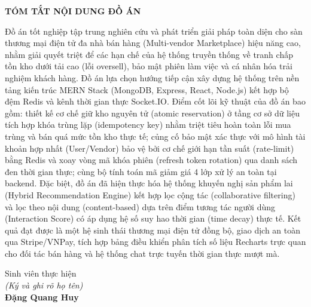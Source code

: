 \documentclass[../DoAn.tex]{subfiles}
\begin{document}
\begin{center}
    \Large{\textbf{TÓM TẮT NỘI DUNG ĐỒ ÁN}}\\
\end{center}
\vspace{1cm}

Đồ án tốt nghiệp tập trung nghiên cứu và phát triển giải pháp toàn diện cho sàn thương mại điện tử đa nhà bán hàng (Multi-vendor Marketplace) hiệu năng cao, nhằm giải quyết triệt để các hạn chế của hệ thống truyền thống về tranh chấp tồn kho dưới tải cao (lỗi oversell), bảo mật phiên làm việc và cá nhân hóa trải nghiệm khách hàng. Đồ án lựa chọn hướng tiếp cận xây dựng hệ thống trên nền tảng kiến trúc MERN Stack (MongoDB, Express, React, Node.js) kết hợp bộ đệm Redis và kênh thời gian thực Socket.IO. Điểm cốt lõi kỹ thuật của đồ án bao gồm: thiết kế cơ chế giữ kho nguyên tử (atomic reservation) ở tầng cơ sở dữ liệu tích hợp khóa trùng lặp (idempotency key) nhằm triệt tiêu hoàn toàn lỗi mua trùng và bán quá mức tồn kho thực tế; củng cố bảo mật xác thực với mô hình tài khoản hợp nhất (User/Vendor) bảo vệ bởi cơ chế giới hạn tần suất (rate-limit) bằng Redis và xoay vòng mã khóa phiên (refresh token rotation) qua danh sách đen thời gian thực; cùng bộ tính toán mã giảm giá 4 lớp xử lý an toàn tại backend. Đặc biệt, đồ án đã hiện thực hóa hệ thống khuyến nghị sản phẩm lai (Hybrid Recommendation Engine) kết hợp lọc cộng tác (collaborative filtering) và lọc theo nội dung (content-based) dựa trên điểm tương tác người dùng (Interaction Score) có áp dụng hệ số suy hao thời gian (time decay) thực tế. Kết quả đạt được là một hệ sinh thái thương mại điện tử đồng bộ, giao dịch an toàn qua Stripe/VNPay, tích hợp bảng điều khiển phân tích số liệu Recharts trực quan cho đối tác bán hàng và hệ thống chat trực tuyến thời gian thực mượt mà.

\begin{flushright}
Sinh viên thực hiện\\
\textit{(Ký và ghi rõ họ tên)}\\
\vspace{1.5cm}
\textbf{Đặng Quang Huy}
\end{flushright}
\end{document}
